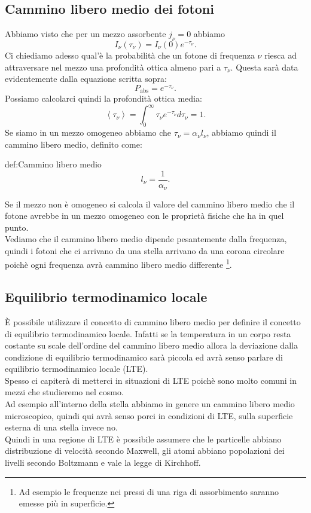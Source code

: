 \subsection{Cammino libero medio dei fotoni}%
Abbiamo visto che per un mezzo assorbente $j _{\nu} = 0$ abbiamo 
\[
	I_{\nu} ( \tau _{\nu} ) = I_{\nu} ( 0) e^{-\tau _{\nu} }
.\] 
Ci chiediamo adesso qual'è la probabilità che un fotone di frequenza $\nu $ riesca ad attraversare nel mezzo una profondità ottica almeno pari a $\tau _{\nu} $. Questa sarà data evidentemente dalla equazione scritta sopra:
\[
	P_{\text{abs}} = e^{-\tau _{\nu} }
.\] 
Possiamo calcolarci quindi la profondità ottica media:
\[
	\left< \tau _{\nu}  \right> = \int_{0}^{\infty} \tau _{\nu} e^{-\tau _{\nu} } d\tau _{\nu} = 1 
.\] 
Se siamo in un mezzo omogeneo abbiamo che $\tau _{\nu} = \alpha _{\nu} l_{\nu} $, abbiamo quindi il cammino libero medio, definito come:
\begin{defn}{def:Cammino libero medio}
\[
	l_{\nu} = \frac{1}{\alpha _{\nu} }
.\] 
\end{defn}
Se il mezzo non è omogeneo si calcola il valore del cammino libero medio che il fotone avrebbe in un mezzo omogeneo con le proprietà fisiche che ha in quel punto.\\
Vediamo che il cammino libero medio dipende pesantemente dalla frequenza, quindi i fotoni che ci arrivano da una stella arrivano da una corona circolare poichè ogni frequenza avrà cammino libero medio differente \footnote{Ad esempio le frequenze nei pressi di una riga di assorbimento saranno emesse più in superficie.}.

\subsection{Equilibrio termodinamico locale}%
È possibile utilizzare il concetto di cammino libero medio per definire il concetto di equilibrio termodinamico locale. Infatti se la temperatura in un corpo resta costante su scale dell'ordine del cammino libero medio allora la deviazione dalla condizione di equilibrio termodinamico sarà piccola ed avrà senso parlare di equilibrio termodinamico locale (LTE).\\
Spesso ci capiterà di metterci in situazioni di LTE poichè sono molto comuni in mezzi che studieremo nel cosmo.\\
Ad esempio all'interno della stella abbiamo in genere un cammino libero medio microscopico, quindi qui avrà senso porci in condizioni di LTE, sulla superficie esterna di una stella invece no. \\
Quindi in una regione di LTE è possibile assumere che le particelle abbiano distribuzione di velocità secondo Maxwell, gli atomi abbiano popolazioni dei livelli secondo Boltzmann e vale la legge di Kirchhoff. 
